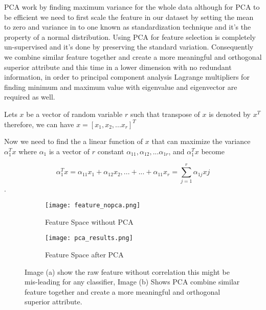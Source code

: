 \documentclass[a4paper, parskip=full]{scrartcl}
\begin{document}
PCA work by finding maximum variance for the whole data although for PCA to be efficient we need to first scale the feature in our dataset by setting the mean to zero and variance in to one known as standardization technique and it’s the property of a normal distribution. Using PCA for feature selection is completely un-supervised and it’s done by preserving the standard variation. Consequently we combine similar feature together and create a more meaningful and orthogonal superior attribute and this time in a lower dimension with no redundant information, in order to principal component analysis Lagrange multipliers for finding minimum and maximum value with eigenvalue and eigenvector are required as well. 


Lets $x$ be a vector of random variable $ r $ such that transpose of $x$ is denoted by $x^T$ therefore, we can have $ x = [x_1,x_2,...x_r]^T$

Now we need to find the a linear function of $x$ that can maximize the variance $\alpha_1^Tx$ where $\alpha_1$ is a vector of $r$ constant $\alpha_{11}, \alpha_{12},...\alpha_{1r}$, and $\alpha_1^Tx$ become

\[\alpha_1^Tx = \alpha_{11}x_1 + \alpha_{12}x_2,...+...+\alpha_{11}x_r = \sum_{j =1}^{r}\alpha_{1j}{xj}\].
 
 
 \begin{figure}
 	\begin{subfigure}{.5\textwidth}
 		\centering
 		\texttt{[image: feature\_nopca.png]}
 		\caption{Feature Space without PCA }
 		\label{fig:sub1}
 	\end{subfigure}
 	\begin{subfigure}{.5\textwidth}
 		\centering
 		\texttt{[image: pca\_results.png]}
 		\caption{Feature Space after PCA}
 		\label{fig:sub2}
 	\end{subfigure}
 	
 	\caption{Image (a) show the raw feature without correlation this might be mis-leading for any classifier, Image (b) Shows PCA combine similar feature together and create a more meaningful and orthogonal superior attribute.}
 	
 	\end{figure}
\end{document}
